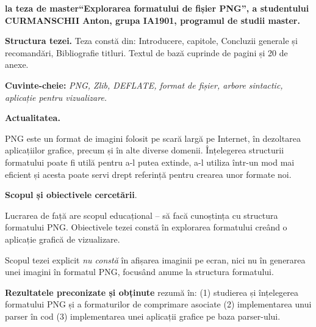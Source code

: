 \documentclass[a4paper,12pt]{report}
\newcommand{\authorName}{CURMANSCHII Anton}
\newcommand{\thesisTitle}{Explorarea formatului de fișier PNG}
\newcommand{\uniGroupName}{IA1901}
\newcommand{\thesisType}{master}
\newcommand{\programulDeStudii}{master}
\newcommand{\anexeCount}{20}
\begin{document}


\clearpage
\tableofcontents

\clearpage
{}
\begin{acronym}
\end{acronym}


\clearpage
{}

\textbf{la teza de \thesisType ``\thesisTitle'', a studentului \authorName{}, grupa \uniGroupName{}, programul de studii \programulDeStudii.}

\textbf{Structura tezei.}
Teza constă din: Introducere,  capitole, Concluzii generale și recomandări, Bibliografie \bibliographyEntryCount{} titluri.
Textul de bază cuprinde \usefulPageCount{} de pagini și \anexeCount{} de anexe.

\textbf{Cuvinte-cheie:}
\textit{\ac{PNG}, \ac{Zlib}, \ac{DEFLATE}, format de fișier, arbore sintactic, aplicație pentru vizualizare.}

\textbf{Actualitatea.}

\ac{PNG} este un format de imagini folosit pe scară largă pe Internet,
în dezoltarea aplicațiilor grafice, precum și în alte diverse domenii.
Înțelegerea structurii formatului poate fi utilă pentru a-l putea extinde, 
a-l utiliza într-un mod mai eficient și acesta poate servi drept referință pentru 
crearea unor formate noi.

\textbf{Scopul și obiectivele cercetării}.

Lucrarea de față are scopul educațional -- să facă cunoștința cu structura formatului \ac{PNG}.
Obiectivele tezei constă în explorarea formatului creând o aplicație grafică de vizualizare.

Scopul tezei explicit \textit{nu constă} în afișarea imaginii pe ecran,
nici nu în generarea unei imagini în formatul PNG,
focusând anume la structura formatului.

\textbf{Rezultatele preconizate și obținute} rezumă în: 
(1) studierea și înțelegerea formatului \ac{PNG} și a formaturilor de comprimare asociate 
(2) implementarea unui parser în cod
(3) implementarea unei aplicații grafice pe baza parser-ului.
\end{document}
